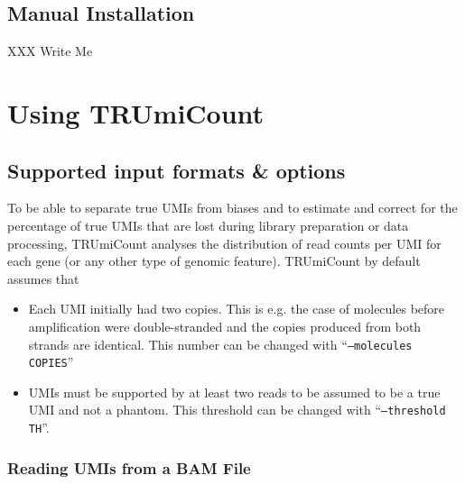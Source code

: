 \documentclass[10pt]{article}
\begin{document}
\subsection{Manual Installation}

XXX Write Me

\section{Using TRUmiCount}

\subsection{Supported input formats \& options}

To be able to separate true UMIs from biases and to estimate and correct for the percentage of true UMIs that are lost during library preparation or data processing, TRUmiCount analyses the distribution of read counts per UMI for each gene (or any other type of genomic feature). TRUmiCount by default assumes that

\begin{itemize}
  \item Each UMI initially had two copies. This is e.g. the case of molecules before amplification were double-stranded and the copies produced from both strands are identical. This number can be changed with ``\texttt{--molecules COPIES}''
  \item UMIs must be supported by at least two reads to be assumed to be a true UMI and not a phantom. This threshold can be changed with ``\texttt{--threshold TH}''.
\end{itemize}

\subsubsection*{Reading UMIs from a BAM File}
\end{document}
